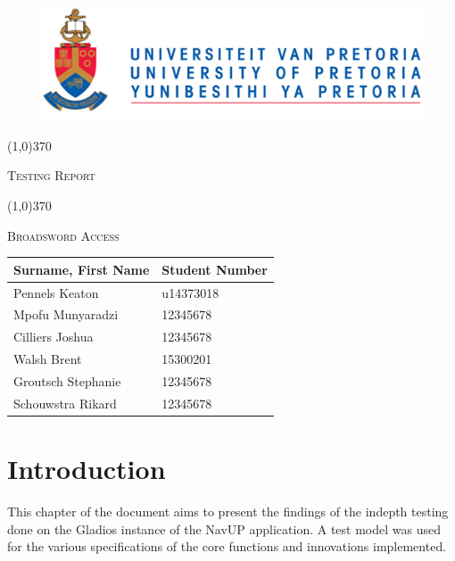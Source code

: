 \documentclass[english]{article}
\begin{document}
	
	\begin{figure}
		\includegraphics[width=\linewidth]{up_logo.png}
	\end{figure}
	
	\begin{center}
	 \line(1,0){370}
	\\[0.2cm]
    {\scshape\Large Testing Report  \par}
	\vspace{0.1cm}
	\line(1,0){370}
	\\[0.8cm]
	
	 {\scshape\Large Broadsword Access \par}
	\vspace{0.9cm}
	
	\begin{tabu} to \textwidth { X[l] X[l]}
		\hline
		\textbf{Surname, First Name  }	& \textbf{Student Number}	\\ \hline \hline
		Pennels 	Keaton   & u14373018	\\ \hline
		Mpofu	Munyaradzi   &12345678		\\ \hline
		Cilliers	Joshua   &12345678		\\ \hline
		Walsh     Brent    &15300201		\\ \hline
		Groutsch	Stephanie    &12345678		\\ \hline
		Schouwstra	Rikard    &12345678		\\ \hline
		\hline
	\end{tabu}
	
	\end{center}
	
	
	\newpage
	\tableofcontents

	\newpage
	
	\section{Introduction}

				This chapter of the document aims to present the findings of the indepth testing done on the Gladios instance of the NavUP application. A test model was used for the various specifications of the core functions and innovations implemented.
\end{document}

